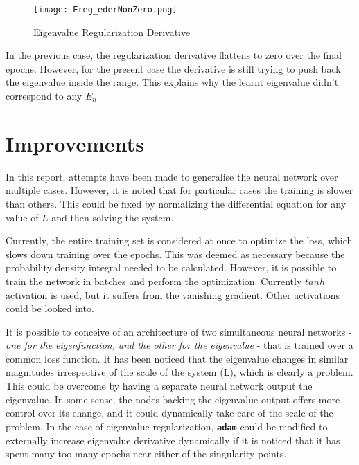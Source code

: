 \documentclass{article}
\newcommand{\adam}{\texttt{\textbf{adam}} }
\begin{document}
\begin{figure}[!htb]
    \centering
    \texttt{[image: Ereg\_ederNonZero.png]}
    \label{fig:Ereg_fallThrough}
    \caption{Eigenvalue Regularization Derivative}
\end{figure}

\justify
In the previous case, the regularization derivative flattens to zero over the final epochs. However, for the present case the derivative is still trying to push back the eigenvalue inside the range. This explains why the learnt eigenvalue didn't correspond to any $E_n$


\section{Improvements}

\justify
In this report, attempts have been made to generalise the neural network over multiple cases. However, it is noted that for particular cases the training is slower than others. This could be fixed by normalizing the differential equation for any value of $L$ and then solving the system.

\justify
Currently, the entire training set is considered at once to optimize the loss, which slows down training over the epochs. This was deemed as necessary because the probability density integral needed to be calculated. However, it is possible to train the network in batches and perform the optimization. Currently $tanh$ activation is used, but it suffers from the vanishing gradient. Other activations could be looked into.

\justify
It is possible to conceive of an architecture of two simultaneous neural networks - \textit{one for the eigenfunction, and the other for the eigenvalue} - that is trained over a common loss function. It has been noticed that the eigenvalue changes in similar magnitudes irrespective of the scale of the system (L), which is clearly a problem. This could be overcome by having a separate neural network output the eigenvalue. In some sense, the nodes backing the eigenvalue output offers more control over its change, and it could dynamically take care of the scale of the problem. In the case of eigenvalue regularization, \adam could be modified to externally increase eigenvalue derivative dynamically if it is noticed that it has spent many too many epochs near either of the singularity points. 
\end{document}

